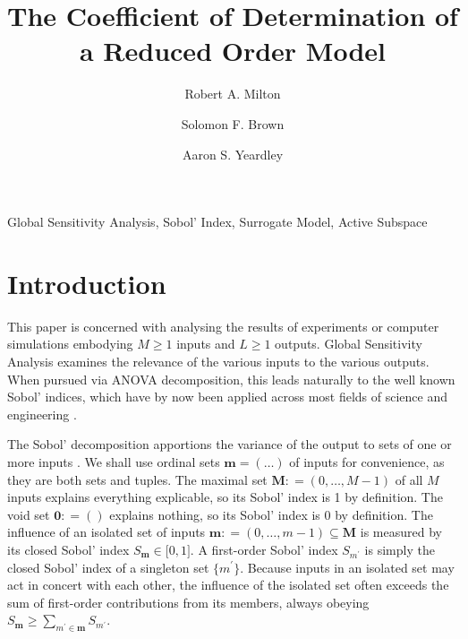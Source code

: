 \documentclass[preprint,12pt]{elsarticle}
\newcommand*{\M}[1]{\ensuremath{#1}\xspace}
\newcommand*{\mi}[1]{\mathbf{#1}}
\newcommand*{\deq}{\M{\mathrel{\mathop:}=}}
\begin{document}
\begin{frontmatter}

    \title{The Coefficient of Determination of a Reduced Order Model}

    \author{Robert A. Milton}

    \author{Solomon F. Brown}

    \author{Aaron S. Yeardley}

    \address{Department of Chemical and Biological Engineering, University of Sheffield, Sheffield, S1 3JD, United Kingdom}       

    \begin{abstract}
    \end{abstract}

    \begin{keyword}
        Global Sensitivity Analysis, Sobol' Index, Surrogate Model, Active Subspace
    \end{keyword}

\end{frontmatter}

\section{Introduction}\label{sec:Intro}
This paper is concerned with analysing the results of experiments or computer simulations embodying $M\geq 1$ inputs and $L\geq 1$ outputs. Global Sensitivity Analysis \cite{Razavi2021} examines the relevance of the various inputs to the various outputs. When pursued via ANOVA decomposition, this leads naturally to the well known Sobol' indices, which have by now been applied across most fields of science and engineering \cite{Saltelli2019,Ghanem2017}. 

The Sobol' decomposition apportions the variance of the output to sets of one or more inputs \cite{Sobol2001}. We shall use ordinal sets $\mi{m} = (\ldots)$ of inputs for convenience, as they are both sets and tuples. The maximal set $\mi{M}\deq(0,\ldots ,M-1)$ of all $M$ inputs explains everything explicable, so its Sobol' index is 1 by definition. The void set $\mi{0}\deq ()$ explains nothing, so its Sobol' index is 0 by definition. 
The influence of an isolated set of inputs $\mi{m}\deq(0,\ldots ,m-1) \subseteq \mi{M}$ is measured by its closed Sobol' index $S_{\mi{m}} \in \lbrack 0,1\rbrack$. A first-order Sobol' index $S_{m^{\prime}}$ is simply the closed Sobol' index of a singleton set $\{m^{\prime}\}$.
Because inputs in an isolated set may act in concert with each other, the influence of the isolated set often exceeds the sum of first-order contributions from its members, always obeying $S_{\mi{m}} \geq \sum_{m^{\prime} \in \mi{m}} S_{m^{\prime}}$.
\end{document}
